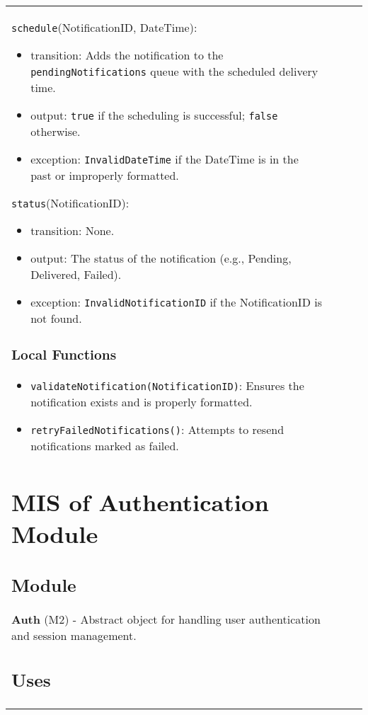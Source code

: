 \documentclass[12pt, titlepage]{article}
\begin{document}
\begin{center}
\begin{tabular}{|p{3cm}|p{4cm}|p{4cm}|p{4cm}|}
\begin{itemize}
\noindent \texttt{schedule}(NotificationID, DateTime):
\begin{itemize}
    \item transition: Adds the notification to the \texttt{pendingNotifications} queue with the scheduled delivery time.
    \item output: \texttt{true} if the scheduling is successful; \texttt{false} otherwise.
    \item exception: \texttt{InvalidDateTime} if the DateTime is in the past or improperly formatted.
\end{itemize}

\noindent \texttt{status}(NotificationID):
\begin{itemize}
    \item transition: None.
    \item output: The status of the notification (e.g., Pending, Delivered, Failed).
    \item exception: \texttt{InvalidNotificationID} if the NotificationID is not found.
\end{itemize}

\subsubsection{Local Functions}

\begin{itemize}
    \item \texttt{validateNotification(NotificationID)}: Ensures the notification exists and is properly formatted.
    \item \texttt{retryFailedNotifications()}: Attempts to resend notifications marked as failed.
\end{itemize}

\newpage

\section{MIS of Authentication Module} \label{Auth}

\subsection{Module}

\textbf{Auth} (M2) - Abstract object for handling user authentication and session management.

\subsection{Uses}


\end{itemize}
\end{tabular}
\end{center}
\end{document}
